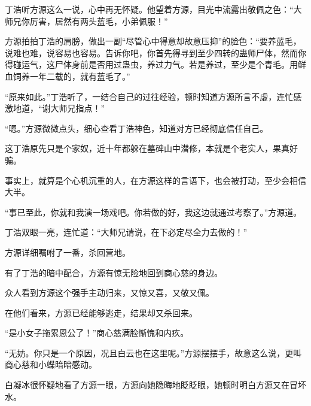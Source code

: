 \begin{this_body}
丁浩听方源这么一说，心中再无怀疑。他望着方源，目光中流露出敬佩之色：“大师兄你厉害，居然有两头蓝毛，小弟佩服！”

方源拍拍丁浩的肩膀，做出一副“尽管心中得意却故意压抑”的脸色：“要养蓝毛，说难也难，说容易也容易。告诉你吧，你首先得寻到至少四转的蛊师尸体，然而你得碰运气，这尸体身前是否用过蛊虫，养过力气。若是养过，至少是个青毛。用鲜血饲养一年二载的，就有蓝毛了。”

“原来如此。”丁浩听了，一结合自己的过往经验，顿时知道方源所言不虚，连忙感激地道，“谢大师兄指点！”

“嗯。”方源微微点头，细心查看丁浩神色，知道对方已经彻底信任自己。

这丁浩原先只是个家奴，近十年都躲在墓碑山中潜修，本就是个老实人，果真好骗。

事实上，就算是个心机沉重的人，在方源这样的言语下，也会被打动，至少会相信大半。

“事已至此，你就和我演一场戏吧。你若做的好，我这边就通过考察了。”方源道。

丁浩双眼一亮，连忙道：“大师兄请说，在下必定尽全力去做的！”

方源详细嘱咐了一番，杀回营地。

有了丁浩的暗中配合，方源有惊无险地回到商心慈的身边。

众人看到方源这个强手主动归来，又惊又喜，又敬又佩。

在他们看来，方源已经能够逃走，结果却又杀回来。

“是小女子拖累恩公了！”商心慈满脸惭愧和内疚。

“无妨。你只是一个原因，况且白云也在这里呢。”方源摆摆手，故意这么说，更叫商心慈和小蝶暗暗感动。

白凝冰很怀疑地看了方源一眼，方源向她隐晦地眨眨眼，她顿时明白方源又在冒坏水。

\end{this_body}

